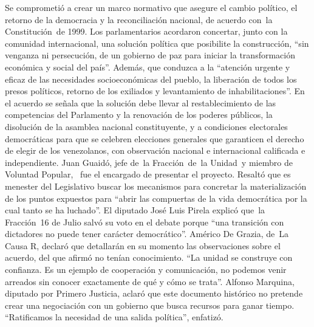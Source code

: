 \documentclass{article}%
\begin{document}
Se comprometió a crear un marco normativo que asegure el cambio político, el retorno de la democracia y la reconciliación nacional, de acuerdo con~la Constitución~de 1999.%
\newline%
%
Los parlamentarios acordaron concertar, junto con la comunidad internacional, una solución política que posibilite la construcción, “sin venganza ni persecución, de un gobierno de paz para iniciar la transformación económica y social del país”. Además, que conduzca a la “atención urgente y eficaz de las necesidades socioeconómicas del pueblo, la liberación de todos los presos políticos, retorno de los exiliados y levantamiento de inhabilitaciones”.%
\newline%
%
En el acuerdo se señala que la solución debe llevar al restablecimiento de las competencias del Parlamento y la renovación de los poderes públicos, la disolución de la asamblea nacional constituyente, y a condiciones electorales democráticas para que se celebren elecciones generales que garanticen el derecho de elegir de los venezolanos, con observación nacional e internacional calificada e independiente.%
\newline%
%
Juan Guaidó, jefe de~la Fracción~de~la Unidad~y miembro de Voluntad Popular, ~fue el encargado de presentar el proyecto. Resaltó que es menester del Legislativo buscar los mecanismos para concretar la materialización de los puntos expuestos para “abrir las compuertas de la vida democrática por la cual tanto se ha luchado”.%
\newline%
%
El diputado José Luis Pirela explicó que~la Fracción~16 de Julio salvó su voto en el debate porque “una transición con dictadores no puede tener carácter democrático”.%
\newline%
%
Américo De Grazia, de~La Causa R, declaró que detallarán en su momento las observaciones sobre el acuerdo, del que afirmó no tenían conocimiento. “La unidad se construye con confianza. Es un ejemplo de cooperación y comunicación, no podemos venir arreados sin conocer exactamente de qué y cómo se trata”.%
\newline%
%
Alfonso Marquina, diputado por Primero Justicia, aclaró que este documento histórico no pretende crear una negociación con un gobierno que busca recursos para ganar tiempo. “Ratificamos la necesidad de una salida política”, enfatizó.%
\newline%
%
\end{document}
